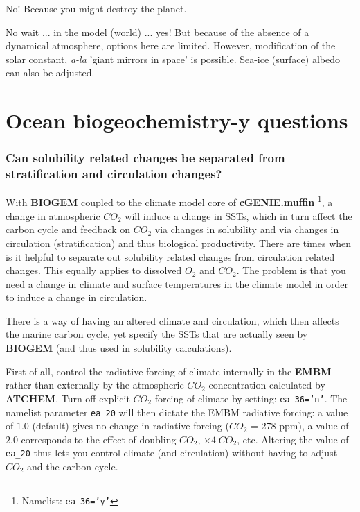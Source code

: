 \documentclass[11pt,fleqn]{book} %
\begin{document}
No! Because you might destroy the planet.

\noindent No wait ... in the model (world) ... yes! But because of the absence of a dynamical atmosphere, options here are limited. However, modification of the solar constant, \textit{a-la} 'giant mirrors in space' is possible. Sea-ice (surface) albedo can also be adjusted.


\newpage


\section{Ocean biogeochemistry-y questions}

%
\subsubsection{Can  solubility related changes be separated from stratification and circulation changes?}

With \textbf{BIOGEM} coupled to the climate model core of \textbf{cGENIE.muffin} \footnote{Namelist: \texttt{ea\_36='y'}}, a change in atmospheric \(CO_{2}\) will induce a change in SSTs, which in turn affect the carbon cycle and feedback on \(CO_{2}\) via changes in solubility and via changes in circulation (stratification) and thus biological productivity. There are times when is it helpful to separate out solubility related changes from circulation related changes. This equally applies to dissolved \(O_{2}\) and \(CO_{2}\). The problem is that you need a change in climate and surface temperatures in the climate model in order to induce a change in circulation.

There is a way of having an altered climate and circulation, which then affects the marine carbon cycle, yet specify the SSTs that are actually seen by \textbf{BIOGEM} (and thus used in solubility calculations).

First of all, control the radiative forcing of climate internally in the \textbf{EMBM} rather than externally by the atmospheric \(CO_{2}\) concentration calculated by \textbf{ATCHEM}. Turn off explicit \(CO_{2}\) forcing of climate by setting: \texttt{ea\_36='n'}. The namelist parameter \texttt{ea\_20} will then dictate the EMBM radiative forcing: a value of \(1.0\) (default) gives no change in radiative forcing (\(CO_{2}\) = 278 ppm), a value of \(2.0\) corresponds to the effect of doubling \(CO_{2}\), \(\times  4\;CO_{2}\), etc. Altering the value of \texttt{ea\_20} thus lets you control climate (and circulation) without having to adjust \(CO_{2}\) and the carbon cycle.
\end{document}
